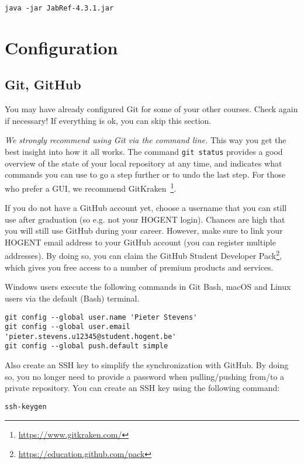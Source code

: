 \begin{verbatim}
java -jar JabRef-4.3.1.jar
\end{verbatim}

\section{Configuration}

\subsection{Git, GitHub}

You may have already configured Git for some of your other courses. Check again if necessary! If everything is ok, you can skip this section.

\emph{We strongly recommend using Git via the command line.} 
This way you get the best insight into how it all works. The command \texttt{git status} provides a good overview of the state of your local repository at any time, and indicates what commands you can use to go a step further or to undo the last step. 
For those who prefer a GUI, we recommend GitKraken~\footnote{\url{https://www.gitkraken.com/}}.

If you do not have a GitHub account yet, choose a username that you can still use after graduation (so e.g. not your HOGENT login). 
Chances are high that you will still use GitHub during your career. However, make sure to link your HOGENT email address to your GitHub account (you can register multiple addresses). By doing so, you can claim the GitHub Student Developer Pack\footnote{\url{https://education.github.com/pack}}, which gives you free access to a number of premium products and services.

Windows users execute the following commands in Git Bash, macOS and Linux users via the default (Bash) terminal.

\begin{verbatim}
git config --global user.name 'Pieter Stevens'
git config --global user.email 'pieter.stevens.u12345@student.hogent.be'
git config --global push.default simple
\end{verbatim}

Also create an SSH key to simplify the synchronization with GitHub. By doing so, you no longer need to provide a password when pulling/pushing from/to a private repository. You can create an SSH key using the following command:

\begin{verbatim}
ssh-keygen
\end{verbatim}


